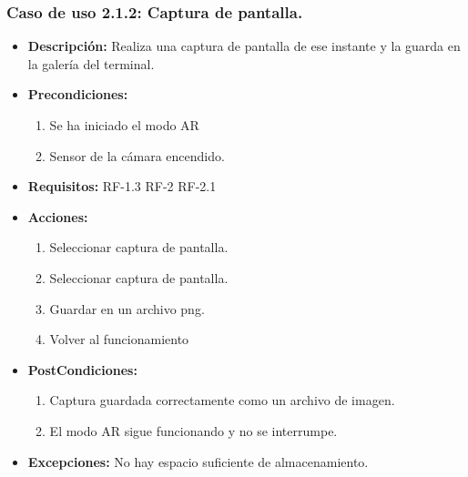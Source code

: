 \subsubsection{Caso de uso 2.1.2: Captura de pantalla. }
 \begin{itemize}
 	\item \textbf{Descripción:} Realiza una captura de pantalla de ese instante y la guarda en la galería del terminal.
 	\item \textbf{Precondiciones:}
	 		\begin{enumerate}
	 		\item Se ha iniciado el modo AR
	 		\item Sensor de la cámara encendido.
	 		
	 	\end{enumerate}
 	\item \textbf{Requisitos:} RF-1.3 RF-2 RF-2.1
 	\item \textbf{Acciones:}
	 	\begin{enumerate}
	 		\item Seleccionar captura de pantalla.
	 		\item Seleccionar captura de pantalla.
	 		\item Guardar en un archivo png.
	 		\item Volver al funcionamiento
	 	\end{enumerate}
 	
 	\item \textbf{PostCondiciones:}
	 	\begin{enumerate}
	 		\item Captura guardada correctamente como un archivo de imagen.
	 		\item El modo AR sigue funcionando y no se interrumpe.
	 		
	 	\end{enumerate}
 
 	\item \textbf{Excepciones:}  No hay espacio suficiente de almacenamiento.
 \end{itemize}
